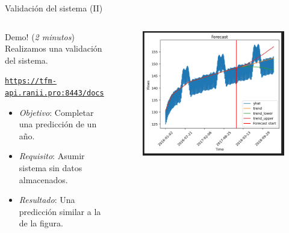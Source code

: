 \documentclass[aspectratio=169,xcolor=dvipsnames]{beamer}
\begin{document}
	\begin{frame}{Validación del sistema (II)}
		\begin{columns}
			\begin{column}{0.52\textwidth}
				\begin{block}{Demo! (\textit{2 minutos})}
					Realizamos una validación del sistema.
					
					\vspace{12px}
					
					\href{https://tfm-api.ranii.pro:8443/docs}{\small \texttt{https://tfm-api.ranii.pro:8443/docs}}
					
					\vspace{12px}
					 
					\begin{itemize}
						\item \textit{Objetivo}: Completar una predicción de un año. 
						\item \textit{Requisito}: Asumir sistema sin datos almacenados.
						\item \textit{Resultado}: Una predicción similar a la de la figura.
					\end{itemize}
				\end{block}
			\end{column}
		
			\begin{column}{0.5\textwidth}
				\begin{figure}[h!]
					\begin{center}
						\includegraphics[width=1\textwidth]{img/graph_forecast_2.png}
					\end{center}
				\end{figure}
			\end{column}
		\end{columns}
	\end{frame}
	
\end{document}
